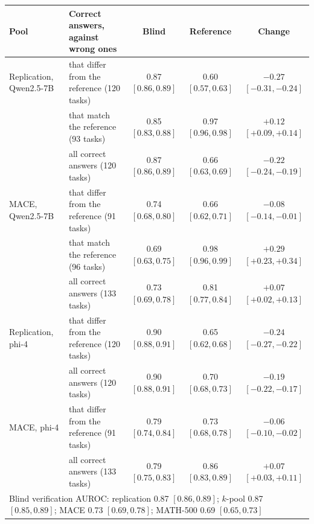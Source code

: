 \begin{tabular}{llccc}
\toprule
Pool & Correct answers, against wrong ones & Blind & Reference & Change \\
\midrule
Replication, Qwen2.5-7B & that differ from the reference (120 tasks) & 0.87 {\scriptsize$[0.86,0.89]$} & 0.60 {\scriptsize$[0.57,0.63]$} & $-0.27$ {\scriptsize$[-0.31,-0.24]$} \\
 & that match the reference (93 tasks) & 0.85 {\scriptsize$[0.83,0.88]$} & 0.97 {\scriptsize$[0.96,0.98]$} & $+0.12$ {\scriptsize$[+0.09,+0.14]$} \\
 & all correct answers (120 tasks) & 0.87 {\scriptsize$[0.86,0.89]$} & 0.66 {\scriptsize$[0.63,0.69]$} & $-0.22$ {\scriptsize$[-0.24,-0.19]$} \\
\addlinespace
\textsc{MACE}, Qwen2.5-7B & that differ from the reference (91 tasks) & 0.74 {\scriptsize$[0.68,0.80]$} & 0.66 {\scriptsize$[0.62,0.71]$} & $-0.08$ {\scriptsize$[-0.14,-0.01]$} \\
 & that match the reference (96 tasks) & 0.69 {\scriptsize$[0.63,0.75]$} & 0.98 {\scriptsize$[0.96,0.99]$} & $+0.29$ {\scriptsize$[+0.23,+0.34]$} \\
 & all correct answers (133 tasks) & 0.73 {\scriptsize$[0.69,0.78]$} & 0.81 {\scriptsize$[0.77,0.84]$} & $+0.07$ {\scriptsize$[+0.02,+0.13]$} \\
\addlinespace
Replication, phi-4 & that differ from the reference (120 tasks) & 0.90 {\scriptsize$[0.88,0.91]$} & 0.65 {\scriptsize$[0.62,0.68]$} & $-0.24$ {\scriptsize$[-0.27,-0.22]$} \\
 & all correct answers (120 tasks) & 0.90 {\scriptsize$[0.88,0.91]$} & 0.70 {\scriptsize$[0.68,0.73]$} & $-0.19$ {\scriptsize$[-0.22,-0.17]$} \\
\addlinespace
\textsc{MACE}, phi-4 & that differ from the reference (91 tasks) & 0.79 {\scriptsize$[0.74,0.84]$} & 0.73 {\scriptsize$[0.68,0.78]$} & $-0.06$ {\scriptsize$[-0.10,-0.02]$} \\
 & all correct answers (133 tasks) & 0.79 {\scriptsize$[0.75,0.83]$} & 0.86 {\scriptsize$[0.83,0.89]$} & $+0.07$ {\scriptsize$[+0.03,+0.11]$} \\
\midrule
\multicolumn{5}{l}{Blind verification AUROC: replication 0.87 {\scriptsize$[0.86,0.89]$}; $k$-pool 0.87 {\scriptsize$[0.85,0.89]$}; \textsc{MACE} 0.73 {\scriptsize$[0.69,0.78]$}; MATH-500 0.69 {\scriptsize$[0.65,0.73]$}} \\
\bottomrule
\end{tabular}
